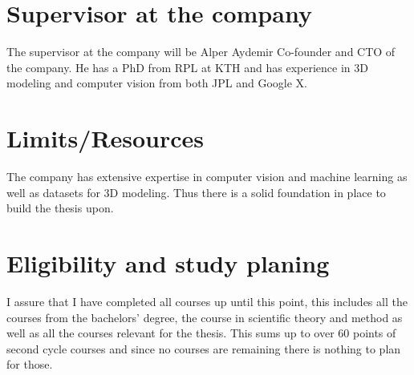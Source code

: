\documentclass[11pt]{article}
\begin{document}
\section{Supervisor at the company}
\label{sec:orgbeefd3a}
The supervisor at the company will be Alper Aydemir Co-founder and CTO of the company. He has a PhD from RPL at KTH and has experience in 3D modeling and computer vision from both JPL and Google X.  

\section{Limits/Resources}
\label{sec:org5963224}
The company has extensive expertise in computer vision and machine learning as well as datasets for 3D modeling. Thus there is a solid foundation in place to build the thesis upon.

\section{Eligibility and study planing}
\label{sec:org6a3dab3}
I assure that I have completed all courses up until this point, this includes all the courses from the bachelors' degree, the course in scientific theory and method as well as all the courses relevant for the thesis. This sums up to over 60 points of second cycle courses and since no courses are remaining there is nothing to plan for those.
\end{document}
